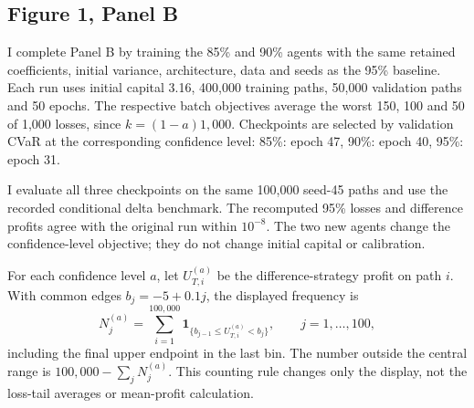 \documentclass[11pt,a4paper]{article}
\theoremstyle{remark}
\begin{document}
\subsection{Figure 1, Panel B}
I complete Panel B by training the 85\% and 90\% agents with the same retained coefficients, initial variance, architecture, data and seeds as the 95\% baseline. Each run uses initial capital 3.16, 400,000 training paths, 50,000 validation paths and 50 epochs. The respective batch objectives average the worst 150, 100 and 50 of 1,000 losses, since $k=(1-a)1,000$. Checkpoints are selected by validation CVaR at the corresponding confidence level: 85\%: epoch 47, 90\%: epoch 40, 95\%: epoch 31.

I evaluate all three checkpoints on the same 100,000 seed-45 paths and use the recorded conditional delta benchmark. The recomputed 95\% losses and difference profits agree with the original run within $10^{-8}$. The two new agents change the confidence-level objective; they do not change initial capital or calibration.

For each confidence level $a$, let $U_{T,i}^{(a)}$ be the difference-strategy profit on path $i$. With common edges $b_j=-5+0.1j$, the displayed frequency is
\[
 N_j^{(a)}=\sum_{i=1}^{100,000}\mathbf1_{\{b_{j-1}\leq U_{T,i}^{(a)}<b_j\}},
 \qquad j=1,\ldots,100,
\]
including the final upper endpoint in the last bin. The number outside the central range is $100,000-\sum_jN_j^{(a)}$. This counting rule changes only the display, not the loss-tail averages or mean-profit calculation.
\end{document}
